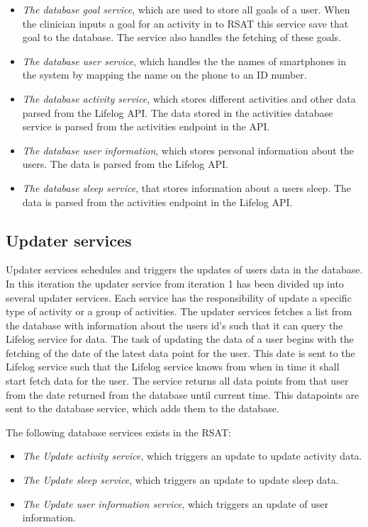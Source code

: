 \documentclass{cslthse-msc}
\begin{document}
\begin{itemize}
\item \emph{The database goal service}, which are used to store all goals of a user. When the clinician inputs a goal for an activity in to RSAT this service save that goal to the database. The service also handles the fetching of these goals. %
\item \emph{The database user service}, which handles the the names of smartphones in the system by mapping the name on the phone to an ID number. %
\item \emph{The database activity service}, which stores different activities and other data parsed from the Lifelog API. The data stored in the activities database service is parsed from the activities endpoint in the API. 
\item \emph{The database user information}, which stores personal information about the users. The data is parsed from the Lifelog API.
\item \emph{The database sleep service}, that stores information about a users sleep. The data is parsed from the activities endpoint in the Lifelog API.
\end{itemize}

\subsection{Updater services}
Updater services schedules and triggers the updates of users data in the database. In this iteration the updater service from iteration 1 has been divided up into several updater services. Each service has the responsibility of update a specific type of activity or a group of activities. The updater services fetches a list from the database with information about the users id’s such that it can query the Lifelog service for data. The task of updating the data of a user begins with the fetching of the date of the latest data point for the user. This date is sent to the Lifelog service such that the Lifelog service knows from when in time it shall start fetch data for the user. The service returns all data points from that user from the date returned from the database until current time. This datapoints are sent to the database service, which adds them to the database. 

The following database services exists in the RSAT:

\begin{itemize}
\item \emph{The Update activity service}, which triggers an update to update activity data.
\item \emph{The Update sleep service}, which triggers an update to update sleep data.
\item \emph{The Update user information service}, which triggers an update of user information.
\end{itemize}
\end{document}
